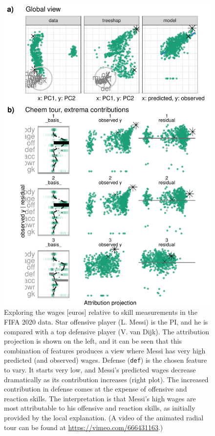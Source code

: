 \documentclass[11pt,twoside]{article}
\begin{document}
\begin{figure}

{\centering \includegraphics[width=0.9\linewidth]{./figures/case_fifa} 

}

\caption{Exploring the wages {[}euros{]} relative to skill measurements in the FIFA 2020 data. Star offensive player (L. Messi) is the PI, and he is compared with a top defensive player (V. van Dijk). The attribution projection is shown on the left, and it can be seen that this combination of features produces a view where Messi has very high predicted (and observed) wages. Defense (\texttt{def}) is the chosen feature to vary. It starts very low, and Messi's predicted wages decrease dramatically as its contribution increases (right plot). The increased contribution in defense comes at the expense of offensive and reaction skills. The interpretation is that Messi's high wages are most attributable to his offensive and reaction skills, as initially provided by the local explanation. (A video of the animated radial tour can be found at \url{https://vimeo.com/666431163}.)}\label{fig:casefifa}
\end{figure}
\end{document}
